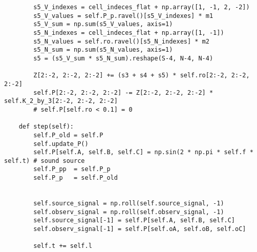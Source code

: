 \documentclass[../main.tex]{subfiles}
\begin{document}
\begin{lstlisting}
        s5_V_indexes = cell_indeces_flat + np.array([1, -1, 2, -2])
        s5_V_values = self.P_p.ravel()[s5_V_indexes] * m1
        s5_V_sum = np.sum(s5_V_values, axis=1)
        s5_N_indexes = cell_indeces_flat + np.array([1, -1])
        s5_N_values = self.ro.ravel()[s5_N_indexes] * m2
        s5_N_sum = np.sum(s5_N_values, axis=1)
        s5 = (s5_V_sum * s5_N_sum).reshape(S-4, N-4, N-4)

        Z[2:-2, 2:-2, 2:-2] += (s3 + s4 + s5) * self.ro[2:-2, 2:-2, 2:-2]
        self.P[2:-2, 2:-2, 2:-2] -= Z[2:-2, 2:-2, 2:-2] * self.K_2_by_3[2:-2, 2:-2, 2:-2]
        # self.P[self.ro < 0.1] = 0
      
    def step(self):
        self.P_old = self.P
        self.update_P()
        self.P[self.A, self.B, self.C] = np.sin(2 * np.pi * self.f * self.t) # sound source
        self.P_pp  = self.P_p
        self.P_p   = self.P_old
        

        self.source_signal = np.roll(self.source_signal, -1)
        self.observ_signal = np.roll(self.observ_signal, -1)
        self.source_signal[-1] = self.P[self.A, self.B, self.C]
        self.observ_signal[-1] = self.P[self.oA, self.oB, self.oC]

        self.t += self.l

\end{lstlisting}
\newpage
\end{document}
